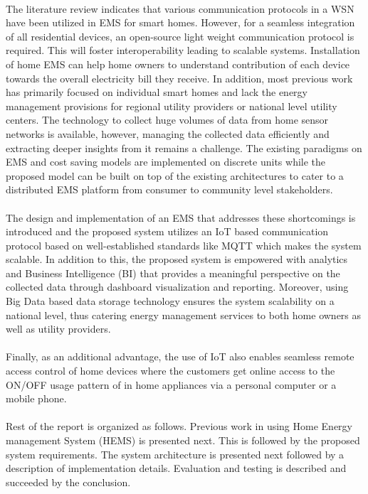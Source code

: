 \documentclass[a4paper,12pt,oneside]{article}
\begin{document}
\paragraph{}
The literature review indicates that various communication
protocols in a WSN have been utilized in EMS for smart
homes. However, for a seamless integration of all residential
devices, an open-source light weight communication protocol
is required. This will foster interoperability leading to scalable
systems. Installation of home EMS can help home owners to
understand contribution of each device towards the overall
electricity bill they receive. In addition, most previous work
has primarily focused on individual smart homes and lack the
energy management provisions for regional utility providers or
national level utility centers. The technology to collect huge
volumes of data from home sensor networks is available,
however, managing the collected data efficiently and
extracting deeper insights from it remains a challenge. The
existing paradigms on EMS and cost saving models are
implemented on discrete units while the proposed model can
be built on top of the existing architectures to cater to a
distributed EMS platform from consumer to community level
stakeholders.
\paragraph{}
The design and implementation of an EMS that addresses these shortcomings is
introduced and the proposed system utilizes an IoT based communication protocol
based on well-established standards like MQTT which makes the system scalable. In addition to this, the proposed system is
empowered with analytics and Business Intelligence (BI) that
provides a meaningful perspective on the collected data through
dashboard visualization and reporting. Moreover, using Big
Data based data storage technology ensures the system
scalability on a national level, thus catering energy management
services to both home owners as well as utility providers.
\paragraph{}
Finally, as
an additional advantage, the use of IoT also enables seamless
remote access control of home devices where the customers
get online access to the ON/OFF usage pattern of in home
appliances via a personal computer or a mobile phone.
\paragraph{}
Rest of the report is organized as follows. Previous work in
using Home Energy management System (HEMS) is
presented next. This is followed by the proposed system
requirements. The system architecture is presented next
followed by a description of implementation details.
Evaluation and testing is described and succeeded by the
conclusion.
\end{document}

